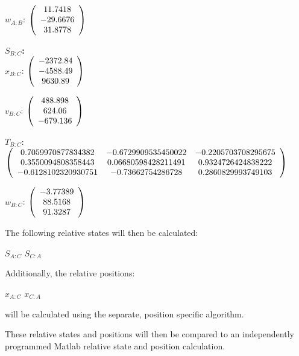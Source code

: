 \begin{description}
$w_{A:B}$:   $\left( \begin{array} {ccc}
 11.7418 \\ -29.6676 \\ 31.8778
\end{array} \right)\\ \\$

\Large{\textbf{$S_{B:C}$:}} \normalsize \\

$x_{B:C}$: $\left( \begin{array} {ccc} -2372.84 \\   -4588.49 \\ 9630.89
\end{array} \right)\\ \\$

$v_{B:C}$:  $\left( \begin{array} {ccc}  488.898 \\ 624.06 \\ -679.136
\end{array} \right)\\ \\$

$T_{B:C}$: $\left( \begin{array} {ccc}
 0.7059970877834382 & -0.6729909535450022 & -0.2205703708295675 \\
  0.3550094808358443 & 0.06680598428211491 & 0.9324726424838222 \\
   -0.6128102320930751 & -0.73662754286728 & 0.2860829993749103
\end{array} \right)\\ \\$

$w_{B:C}$:  $\left( \begin{array} {ccc}  -3.77389 \\  88.5168 \\  91.3287
\end{array} \right)\\ \\$


The following relative states will then be calculated:

$S_{A:C}$
$S_{C:A}$

Additionally, the relative positions:

$x_{A:C}$
$x_{C:A}$

will be calculated using the separate, position specific algorithm.

These relative states and positions will then be compared to an
independently programmed Matlab relative state and position calculation.



\end{description}
